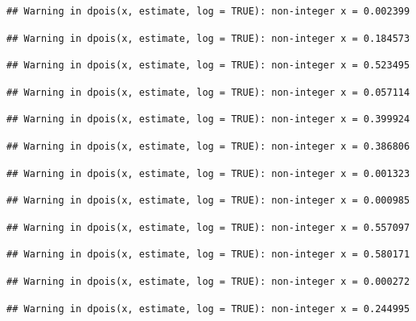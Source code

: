 \documentclass[]{article}
\begin{document}
\begin{verbatim}
## Warning in dpois(x, estimate, log = TRUE): non-integer x = 0.002399
\end{verbatim}

\begin{verbatim}
## Warning in dpois(x, estimate, log = TRUE): non-integer x = 0.184573
\end{verbatim}

\begin{verbatim}
## Warning in dpois(x, estimate, log = TRUE): non-integer x = 0.523495
\end{verbatim}

\begin{verbatim}
## Warning in dpois(x, estimate, log = TRUE): non-integer x = 0.057114
\end{verbatim}

\begin{verbatim}
## Warning in dpois(x, estimate, log = TRUE): non-integer x = 0.399924
\end{verbatim}

\begin{verbatim}
## Warning in dpois(x, estimate, log = TRUE): non-integer x = 0.386806
\end{verbatim}

\begin{verbatim}
## Warning in dpois(x, estimate, log = TRUE): non-integer x = 0.001323
\end{verbatim}

\begin{verbatim}
## Warning in dpois(x, estimate, log = TRUE): non-integer x = 0.000985
\end{verbatim}

\begin{verbatim}
## Warning in dpois(x, estimate, log = TRUE): non-integer x = 0.557097
\end{verbatim}

\begin{verbatim}
## Warning in dpois(x, estimate, log = TRUE): non-integer x = 0.580171
\end{verbatim}

\begin{verbatim}
## Warning in dpois(x, estimate, log = TRUE): non-integer x = 0.000272
\end{verbatim}

\begin{verbatim}
## Warning in dpois(x, estimate, log = TRUE): non-integer x = 0.244995
\end{verbatim}
\end{document}
